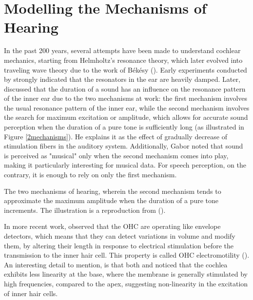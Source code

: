 \section{Modelling the Mechanisms of Hearing}
In the past 200 years, several attempts have been made to understand cochlear mechanics, starting from Helmholtz's resonance theory, which later evolved into traveling wave theory due to the work of Békésy (\cite{manley_experiments_2012}).
Early experiments conducted by \textcite{wegel_auditory_1924} strongly indicated that the resonators in the ear are heavily damped. Later, \textcite{gabor_acoustical_1947} discussed that the duration of a sound has an influence on the resonance pattern of the inner ear due to the two mechanisms at work: the first mechanism involves the usual resonance pattern of the inner ear, while the second mechanism involves the search for maximum excitation or amplitude, which allows for accurate sound perception when the duration of a pure tone is sufficiently long (as illustrated in Figure \ref{2mechanisms}). He explains it as the effect of gradually decrease of stimulation fibers in the auditory system. Additionally, Gabor noted that sound is perceived as "musical" only when the second mechanism comes into play, making it particularly interesting for musical data. For speech perception, on the contrary, it is enough to rely on only the first mechanism. 
\begin{marginfigure}
\centering

\vspace{0.1cm}
\caption{The two mechanisms of hearing, wherein the second mechanism tends to approximate the maximum amplitude when the duration of a pure tone increments. The illustration is a reproduction from (\cite{gabor_acoustical_1947}).}
\label{2mechanisms}  
\end{marginfigure}

In more recent work, \textcite{vavakou_frequency_2019} observed that the OHC are operating like envelope detectors, which means that they can detect variations in volume and modify them, by altering their length in response to electrical stimulation before the transmission to the inner hair cell. This property is called OHC electromotility (\cite{brownell_what_2017}). An interesting detail to mention, is that both \textcite{brownell_what_2017} and \textcite{bacon_growth_1999} noticed that the cochlea exhibits less linearity at the base, where the membrane is generally stimulated by high frequencies, compared to the apex, suggesting non-linearity in the excitation of inner hair cells. 




